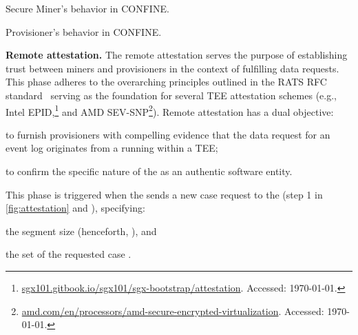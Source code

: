 \begin{algorithm2e}[tb]
	
	\caption{Secure Miner's behavior in CONFINE.}
	\label{alg:secm}
\end{algorithm2e} 
\begin{algorithm2e}[tb]
	
	\caption{Provisioner's behavior in CONFINE.}
	\label{alg:lprv}
\end{algorithm2e} 
%
\noindent\textbf{Remote attestation.} The remote attestation serves the purpose of establishing trust between miners and provisioners in the context of fulfilling data requests. This phase adheres to the overarching principles outlined in the RATS RFC standard~\citep{rfc9334} serving as the foundation for several TEE attestation schemes (e.g., Intel EPID,\footnote{\url{sgx101.gitbook.io/sgx101/sgx-bootstrap/attestation}. Accessed: \today.} and AMD SEV-SNP\footnote{\url{amd.com/en/processors/amd-secure-encrypted-virtualization}. Accessed: \today.}). Remote attestation has a dual objective:
\begin{inparaenum}
    \item to furnish provisioners with compelling evidence that the data request for an event log originates from a  running within a TEE;
    \item to confirm the specific nature of the  as an authentic  software entity.
\end{inparaenum}
This phase is triggered when the  sends a new case request to the (step 1 in \cref{fig:attestation} and ), specifying:
\begin{inparaenum}
    \item the segment size (henceforth, \SegSize), and
    \item the set of the requested case \CIdS.
\end{inparaenum}
